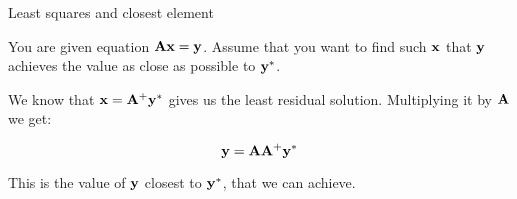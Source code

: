 \documentclass{beamer}
\begin{document}
\begin{frame}{Least squares and closest element}
	\begin{flushleft}
		
		You are given equation $\mathbf{A}\mathbf{x} = \mathbf{y}$. Assume that you want to find such $\mathbf{x}$ that $ \mathbf{y}$ achieves the value as close as possible to $\mathbf{y}^*$.
		
		\bigskip
		
		We know that $\mathbf{x} = \mathbf{A}^+\mathbf{y}^*$ gives us the least residual solution. Multiplying it by $\mathbf{A}$ we get:
		
		\begin{equation}
			\mathbf{y} = \mathbf{A}\mathbf{A}^+\mathbf{y}^*
		\end{equation}
	
	This is the value of $\mathbf{y}$ closest to $\mathbf{y}^*$, that we can achieve.
	
	\end{flushleft}
\end{frame}



%
%
%
%
\end{document}
